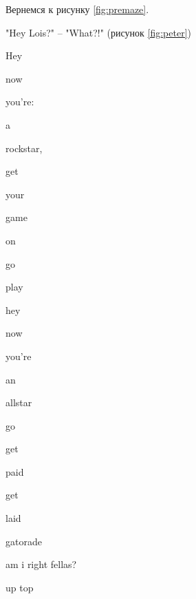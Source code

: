 \documentclass{gostdoc}
\begin{document}

\conclusion
Вернемся к рисунку \ref{fig:premaze}.

\lipsum[11]

\appendix
\lipsum[16]

"Hey Lois?" -- "What?!" (рисунок \ref{fig:peter})


\begin{numberedlist}
    \item Hey
    \item now
    \item you're:
    \begin{numberedlist}
        \item a
        \item rockstar,
        \item get
        \item your
        \item game
        \item on
        \begin{numberedlist}
            \item go
            \item play
        \end{numberedlist}
    \end{numberedlist}
    \item hey
    \item now
    \item you're
    \item an
    \item allstar
    \begin{numberedlist}
        \item go
        \item get
        \item paid
        \item get
        \item laid
        \begin{numberedlist}
            \item gatorade
            \item am i right fellas?
            \item up top
        \end{numberedlist}
    \end{numberedlist}
\end{numberedlist}
\end{document}
